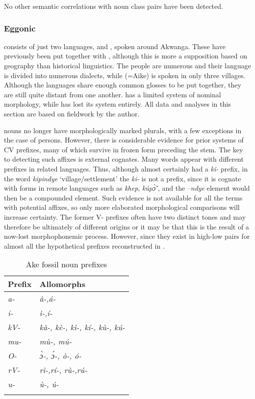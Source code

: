 \documentclass[output=paper]{langsci/langscibook}
\begin{document}
No other semantic correlations with noun class pairs have been detected.

\subsubsection{Eggonic} %

 consists of just two languages,  and , spoken around Akwanga. These have previously been put together with , although this is more a supposition based on geography than historical linguistics. The  people are numerous and their language is divided into numerous dialects, while  (=Aike) is spoken in only three villages. Although the languages share enough common glosses to be put together, they are still quite distant from one another.  has a limited system of nominal morphology, while  has lost its system entirely. All data and analyses in this section are based on fieldwork by the author.

 nouns no longer have morphologically marked plurals, with a few exceptions in the case of persons. However, there is considerable evidence for prior systems of CV prefixes, many of which survive in frozen form preceding the stem. The key to detecting such affixes is external cognates. Many words appear with different prefixes in related languages. Thus, although  almost certainly had a \textit{ki-} prefix, in the word \textit{kipindye} ‘village/settlement’ the \textit{ki-} is not a prefix, since it is cognate with forms in remote  languages such as  \textit{khep},  \textit{kúp\`{ɔ̃} }, and the –\textit{ndye} element would then be a compounded element. Such evidence is not available for all the terms with potential affixes, so only more elaborated morphological comparisons will increase certainty. The former V- prefixes often have two distinct tones and may therefore be ultimately of different origins or it may be that this is the result of a now-lost morphophonemic process. However, since they exist in high-low pairs for almost all the hypothetical prefixes reconstructed in .

\begin{table}
\caption{\label{tab:nomaffplat:20} Ake fossil noun prefixes} 
\begin{tabularx}{\textwidth}{XX}
\lsptoprule
  Prefix 	&   Allomorphs\\
\midrule
\itshape a- 	& \itshape à-,á-\\
\itshape i- 	& \itshape ì-,í-\\
\itshape kV- 	& \itshape kà-, kè-, kì-, kí-, kù-, kú-\\
\itshape mu- 	& \itshape mù-, mú-\\
\itshape O- 	& \itshape ɔ̀-, ɔ́-, ò-, ó-\\
\itshape rV-	& \itshape rì-,rí-, rù-,rú-\\
\itshape u- 	& \itshape ù-, ú-\\
\lspbottomrule
\end{tabularx}
\end{table}
\end{document}
